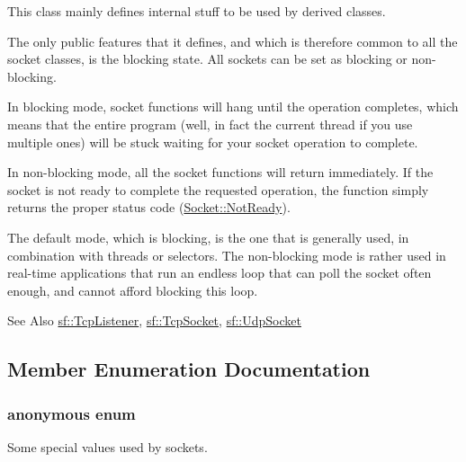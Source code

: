 This class mainly defines internal stuff to be used by derived classes.

The only public features that it defines, and which is therefore common to all the socket classes, is the blocking state. All sockets can be set as blocking or non-\/blocking.

In blocking mode, socket functions will hang until the operation completes, which means that the entire program (well, in fact the current thread if you use multiple ones) will be stuck waiting for your socket operation to complete.

In non-\/blocking mode, all the socket functions will return immediately. If the socket is not ready to complete the requested operation, the function simply returns the proper status code (\hyperlink{classsf_1_1_socket_a51bf0fd51057b98a10fbb866246176dca412bf3512c20bfcbcd511858d55acfbd}{Socket\-::\-Not\-Ready}).

The default mode, which is blocking, is the one that is generally used, in combination with threads or selectors. The non-\/blocking mode is rather used in real-\/time applications that run an endless loop that can poll the socket often enough, and cannot afford blocking this loop.

\begin{DoxySeeAlso}{See Also}
\hyperlink{classsf_1_1_tcp_listener}{sf\-::\-Tcp\-Listener}, \hyperlink{classsf_1_1_tcp_socket}{sf\-::\-Tcp\-Socket}, \hyperlink{classsf_1_1_udp_socket}{sf\-::\-Udp\-Socket} 
\end{DoxySeeAlso}


\subsection{Member Enumeration Documentation}
\hypertarget{classsf_1_1_socket_a9fd5408593f9e3a357c339739cc77946}{\subsubsection[{anonymous enum}]{\setlength{\rightskip}{0pt plus 5cm}anonymous enum}}\label{classsf_1_1_socket_a9fd5408593f9e3a357c339739cc77946}


Some special values used by sockets. 

